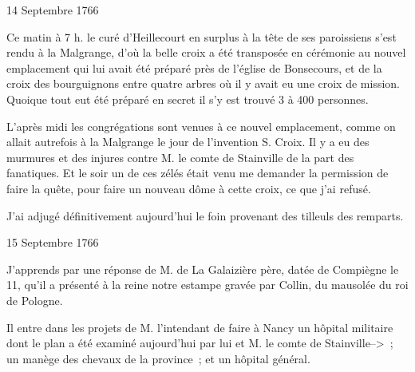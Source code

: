                      \begin{diary}{14 Septembre 1766}{}
                        
                         Ce matin à 7 h. le curé d’Heillecourt en
                           surplus à la tête de ses paroissiens s’est
                           rendu à la Malgrange, d’où
                           la belle croix a été 
                           transposée en cérémonie
                           au nouvel emplacement
                           qui lui avait été préparé près de l’église
                              de Bonsecours, et de la croix des bourguignons
                           entre quatre arbres où il y avait eu une croix
                           de mission. Quoique tout eut été préparé
                           en secret il s’y est trouvé 3 à 400 personnes. \bigskip
        
        
                         L’après midi les congrégations sont venues
                           à ce nouvel emplacement, comme on allait
                           autrefois à la Malgrange le
                           jour de l’invention
                           S. Croix. Il y a eu des murmures et des
                           injures contre M. le comte de Stainville de la part
                           des fanatiques. Et le soir un de ces zélés
                           était venu me demander la permission de
                           faire la quête, pour faire un nouveau
                           dôme à cette croix, ce que j’ai refusé. \bigskip
        
        
                         J’ai adjugé définitivement aujourd'hui
                           le foin provenant des tilleuls des remparts. \bigskip
        
        
                     \end{diary}

                     \begin{diary}{15 Septembre 1766}{}
                        
                         J’apprends par une réponse de M. de La Galaizière
                              père, datée de Compiègne
                           le 11, qu’il
                           a présenté à la
                              reine notre estampe
                           gravée par Collin, du mausolée du
                              roi
                              de Pologne. \bigskip
        
        
                         Il entre dans les projets de M. l’intendant
                           de faire à Nancy un hôpital
                           militaire
                           dont le plan a été examiné aujourd'hui
                           par lui et M. le comte de
                              Stainville--> ; un
                           manège des chevaux de la province ; et
                           un hôpital général. \bigskip
        
        
                     \end{diary}
                     

